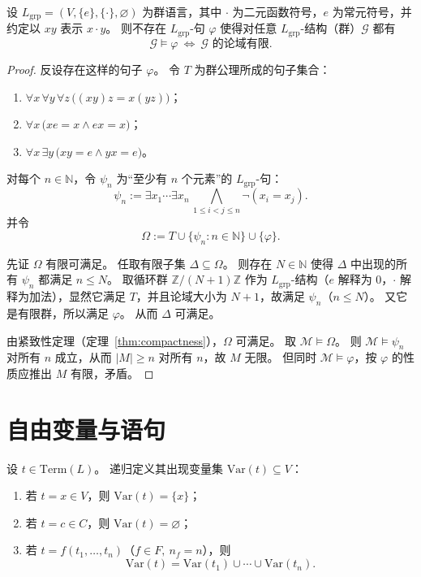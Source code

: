 \documentclass[lang=cn,a4paper,newtx,section]{elegantbook}
\begin{document}
\begin{proposition}[有限群不能由一句子刻画]
\label{finite-group-not-definable}
设 $L_{\mathrm{grp}}=(V,\{e\},\{\cdot\},\varnothing)$ 为群语言，其中 $\cdot$ 为二元函数符号，$e$ 为常元符号，并约定以 $xy$ 表示 $x\cdot y$。
则不存在 $L_{\mathrm{grp}}$-句 $\varphi$ 使得对任意 $L_{\mathrm{grp}}$-结构（群）$\mathcal G$ 都有
\[
  \mathcal G\models\varphi\ \Longleftrightarrow\ \text{$\mathcal G$ 的论域有限}.
\]
\end{proposition}

\begin{proof}
反设存在这样的句子 $\varphi$。
令 $T$ 为群公理所成的句子集合：
\begin{enumerate}
  \item $\forall x\,\forall y\,\forall z\,\bigl((xy)z=x(yz)\bigr)$；
  \item $\forall x\,\bigl(xe=x\wedge ex=x\bigr)$；
  \item $\forall x\,\exists y\,\bigl(xy=e\wedge yx=e\bigr)$。
\end{enumerate}

对每个 $n\in\mathbb N$，令 $\psi_n$ 为“至少有 $n$ 个元素”的 $L_{\mathrm{grp}}$-句：
\[
  \psi_n:=\exists x_1\cdots\exists x_n\,\bigwedge_{1\le i<j\le n}\neg(x_i=x_j).
\]
并令
\[
  \Omega:=T\cup\{\psi_n:n\in\mathbb N\}\cup\{\varphi\}.
\]

先证 $\Omega$ 有限可满足。
任取有限子集 $\Delta\subseteq\Omega$。
则存在 $N\in\mathbb N$ 使得 $\Delta$ 中出现的所有 $\psi_n$ 都满足 $n\le N$。
取循环群 $\mathbb Z/(N+1)\mathbb Z$ 作为 $L_{\mathrm{grp}}$-结构（$e$ 解释为 $0$，$\cdot$ 解释为加法），显然它满足 $T$，并且论域大小为 $N+1$，故满足 $\psi_n$（$n\le N$）。
又它是有限群，所以满足 $\varphi$。
从而 $\Delta$ 可满足。

由紧致性定理（定理~\ref{thm:compactness}），$\Omega$ 可满足。
取 $\mathcal M\models\Omega$。
则 $\mathcal M\models\psi_n$ 对所有 $n$ 成立，从而 $|M|\ge n$ 对所有 $n$，故 $M$ 无限。
 但同时 $\mathcal M\models\varphi$，按 $\varphi$ 的性质应推出 $M$ 有限，矛盾。
\end{proof}

\section{自由变量与语句}

\begin{definition}[项中出现的变量]
\label{vars-in-term}
设 $t\in\mathrm{Term}(L)$。
递归定义其出现变量集 $\mathrm{Var}(t)\subseteq V$：
\begin{enumerate}
  \item 若 $t=x\in V$，则 $\mathrm{Var}(t)=\{x\}$；
  \item 若 $t=c\in C$，则 $\mathrm{Var}(t)=\varnothing$；
  \item 若 $t=f(t_1,\dots,t_n)$（$f\in F,\ n_f=n$），则
  \[
    \mathrm{Var}(t)=\mathrm{Var}(t_1)\cup\cdots\cup\mathrm{Var}(t_n).
  \]
\end{enumerate}
\end{definition}
\end{document}

